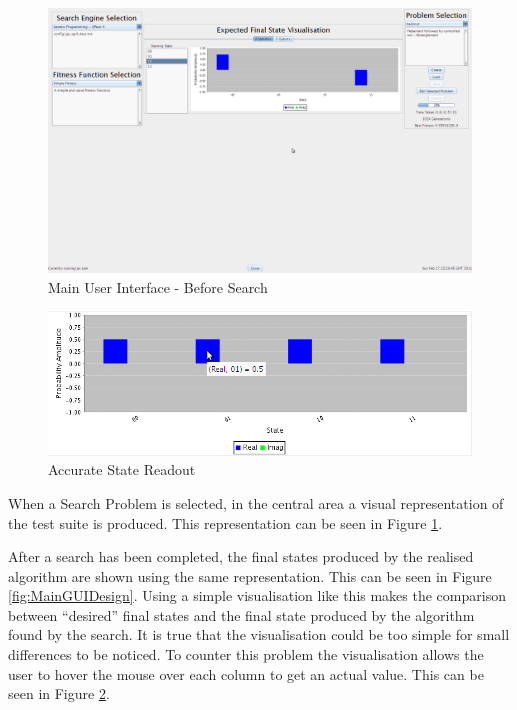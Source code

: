 \begin{figure}
 \includegraphics[width=\textwidth]{GUIDesignProgress.png}
\caption{Main User Interface - Before Search}
\label{fig:MainGUIDesignProg}
\end{figure}
\begin{figure}
 \includegraphics[width=\textwidth]{AccurateReadOutMouseOver.png}
\caption{Accurate State Readout}
\label{fig:AccStateReadOut}
\end{figure}
When a Search Problem is selected, in the central area a visual representation of the test suite is produced.
This representation can be seen in Figure \ref{fig:MainGUIDesignProg}.

After a search has been completed, the final states produced by the realised algorithm are shown using the same representation.
This can be seen in Figure \ref{fig:MainGUIDesign}.
Using a simple visualisation like this makes the comparison between ``desired'' final states and the final state produced by the algorithm found by the search.
It is true that the visualisation could be too simple for small differences to be noticed.
To counter this problem the visualisation allows the user to hover the mouse over each column to get an actual value.
This can be seen in Figure \ref{fig:AccStateReadOut}.

